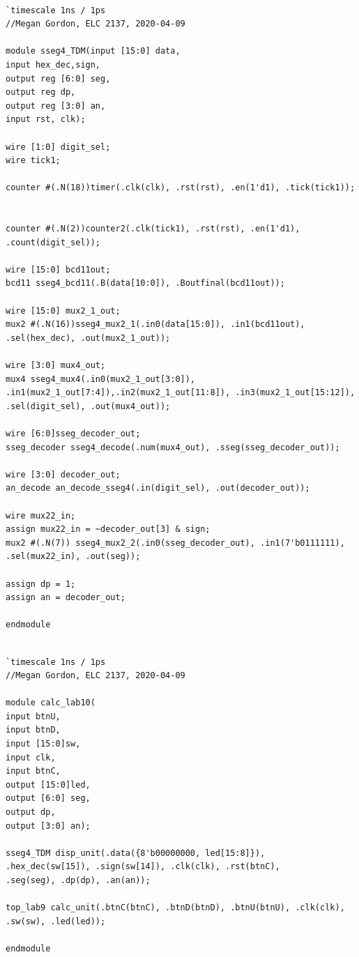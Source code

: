 \documentclass[11pt]{article}
\begin{document}
\begin{lstlisting}[style=Verilog,caption=7-Seg Driver Code,label=code:ex ]

`timescale 1ns / 1ps
//Megan Gordon, ELC 2137, 2020-04-09

module sseg4_TDM(input [15:0] data,
input hex_dec,sign,
output reg [6:0] seg,
output reg dp,
output reg [3:0] an,
input rst, clk);

wire [1:0] digit_sel;
wire tick1;

counter #(.N(18))timer(.clk(clk), .rst(rst), .en(1'd1), .tick(tick1));


counter #(.N(2))counter2(.clk(tick1), .rst(rst), .en(1'd1), .count(digit_sel));

wire [15:0] bcd11out;
bcd11 sseg4_bcd11(.B(data[10:0]), .Boutfinal(bcd11out));

wire [15:0] mux2_1_out;
mux2 #(.N(16))sseg4_mux2_1(.in0(data[15:0]), .in1(bcd11out), .sel(hex_dec), .out(mux2_1_out));

wire [3:0] mux4_out;
mux4 sseg4_mux4(.in0(mux2_1_out[3:0]), .in1(mux2_1_out[7:4]),.in2(mux2_1_out[11:8]), .in3(mux2_1_out[15:12]), .sel(digit_sel), .out(mux4_out));

wire [6:0]sseg_decoder_out;
sseg_decoder sseg4_decode(.num(mux4_out), .sseg(sseg_decoder_out));

wire [3:0] decoder_out;
an_decode an_decode_sseg4(.in(digit_sel), .out(decoder_out));

wire mux22_in; 
assign mux22_in = ~decoder_out[3] & sign; 
mux2 #(.N(7)) sseg4_mux2_2(.in0(sseg_decoder_out), .in1(7'b0111111), .sel(mux22_in), .out(seg));

assign dp = 1;
assign an = decoder_out;

endmodule

\end{lstlisting}
\clearpage

\begin{lstlisting}[style=Verilog,caption=Top-Level Calculator Code,label=code:ex ]

`timescale 1ns / 1ps
//Megan Gordon, ELC 2137, 2020-04-09

module calc_lab10(
input btnU,
input btnD,
input [15:0]sw,
input clk,
input btnC,
output [15:0]led,
output [6:0] seg,
output dp,
output [3:0] an);

sseg4_TDM disp_unit(.data({8'b00000000, led[15:8]}), 
.hex_dec(sw[15]), .sign(sw[14]), .clk(clk), .rst(btnC), 
.seg(seg), .dp(dp), .an(an));

top_lab9 calc_unit(.btnC(btnC), .btnD(btnD), .btnU(btnU), .clk(clk),
.sw(sw), .led(led));

endmodule

\end{lstlisting}
\clearpage
\end{document}
